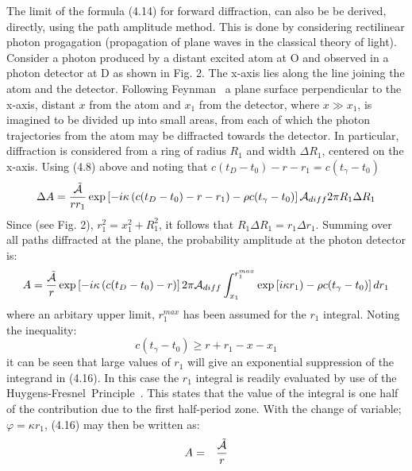 {  \par The limit of the formula (4.14) for forward diffraction, can also be be derived,
    directly, using the path amplitude
    method. This is done by
  considering rectilinear photon progagation (propagation
   of plane waves in the classical theory of light). Consider a photon produced by a distant
   excited atom at O and observed in a photon detector at D as shown in Fig. 2. The x-axis lies along the line 
   joining the atom and the detector. Following Feynman~\cite{Feyn9} a plane surface perpendicular
   to the x-axis, distant $x$ from the atom and $x_1$ from the detector, where $x \gg x_1$, is 
   imagined to be divided up into small areas, from each of which the photon trajectories
    from the atom may be diffracted towards the detector. In particular, diffraction is considered
    from a ring of radius $R_1$ and width $\Delta R_1$, centered on the x-axis. Using (4.8) above
    and noting that $c(t_D-t_0)-r-r_1 = c(t_{\gamma}-t_0)$
   \begin{equation}
  \Delta A = \frac{\tilde{{\cal A}}}{r r_1}
   \exp \left[ - i \kappa \left(c(t_D-t_0)-r-r_1 \right)-\rho c(t_{\gamma}-t_0)\right]
  {\cal A}_{diff} 2 \pi R_1 \Delta R_1
 \end{equation} 
   Since (see Fig. 2), $r_1^2 = x_1^2+R_1^2$, it follows that $R_1 \Delta R_1 = r_1  \Delta r_1$.
   Summing over
   all paths diffracted at the plane, the probability amplitude at the photon detector is:
    \begin{equation}
  A =  \frac{\tilde{{\cal A}}}{r}
   \exp\left[ -i \kappa\left( c(t_D-t_0)- r\right)\right] 2 \pi {\cal A}_{diff}
   \int_{x_1}^{r_1^{max}} \exp\left[ i\kappa r_1)-\rho c (t_{\gamma}-t_0) \right]dr_1 
 \end{equation} 
   where an arbitary upper limit, $r_1^{max}$ has been assumed for the $r_1$ integral. 
   Noting the inequality:
     \begin{equation}
       c (t_{\gamma}-t_0) \ge r+r_1- x -x_1
   \end{equation} 
    it can be seen that large values of $r_1$  will give an exponential 
     suppression of the integrand in (4.16). In this case the $r_1$ integral is readily evaluated
 by use of the Huygens-Fresnel\ Principle~\cite{BW1}. This states that the value of the 
  integral is one half of the contribution due to the first half-period zone. With the change
   of variable; $\varphi = \kappa r_1$, (4.16) may then be written as:
 \begin{eqnarray}
A  & = & \frac{\tilde{{\cal A}}}{r}

\end{eqnarray}}
